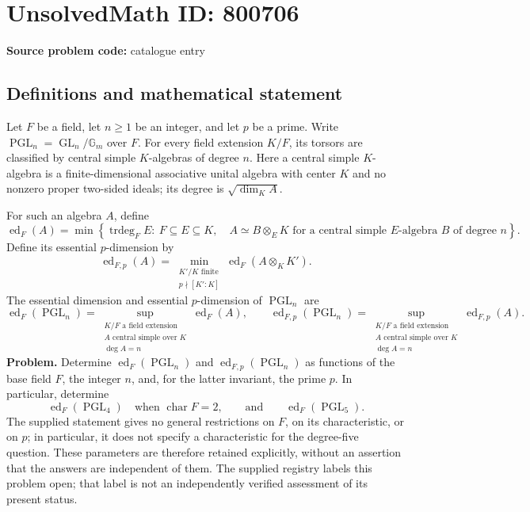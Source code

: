 \documentclass[11pt]{article}
\newcommand{\A}{\mathbb{A}}
\begin{document}
\section*{UnsolvedMath ID: 800706}
\textbf{Source problem code:} catalogue entry
\subsection{Definitions and mathematical statement}
Let \(F\) be a field, let \(n\geq 1\) be an integer, and let \(p\) be a prime. Write \(\operatorname{PGL}_n=\operatorname{GL}_n/\mathbb{G}_m\) over \(F\). For every field extension \(K/F\), its torsors are classified by central simple \(K\)-algebras of degree \(n\). Here a central simple \(K\)-algebra is a finite-dimensional associative unital algebra with center \(K\) and no nonzero proper two-sided ideals; its degree is \(\sqrt{\dim_K A}\).

For such an algebra \(A\), define
\[
\operatorname{ed}_F(A)=\min\left\{\operatorname{trdeg}_F E:\ F\subseteq E\subseteq K,\quad A\simeq B\otimes_E K\text{ for a central simple }E\text{-algebra }B\text{ of degree }n\right\}.
\]
Define its essential \(p\)-dimension by
\[
\operatorname{ed}_{F,p}(A)=\min_{\substack{K'/K\text{ finite}\\p\nmid[K':K]}}\operatorname{ed}_F(A\otimes_K K').
\]
The essential dimension and essential \(p\)-dimension of \(\operatorname{PGL}_n\) are
\[
\operatorname{ed}_F(\operatorname{PGL}_n)=\sup_{\substack{K/F\text{ a field extension}\\A\text{ central simple over }K\\\deg A=n}}\operatorname{ed}_F(A),
\qquad
\operatorname{ed}_{F,p}(\operatorname{PGL}_n)=\sup_{\substack{K/F\text{ a field extension}\\A\text{ central simple over }K\\\deg A=n}}\operatorname{ed}_{F,p}(A).
\]
\textbf{Problem.} Determine \(\operatorname{ed}_F(\operatorname{PGL}_n)\) and \(\operatorname{ed}_{F,p}(\operatorname{PGL}_n)\) as functions of the base field \(F\), the integer \(n\), and, for the latter invariant, the prime \(p\). In particular, determine
\[
\operatorname{ed}_F(\operatorname{PGL}_4)\quad\text{when }\operatorname{char}F=2,
\qquad\text{and}\qquad
\operatorname{ed}_F(\operatorname{PGL}_5).
\]
The supplied statement gives no general restrictions on \(F\), on its characteristic, or on \(p\); in particular, it does not specify a characteristic for the degree-five question. These parameters are therefore retained explicitly, without an assertion that the answers are independent of them. The supplied registry labels this problem open; that label is not an independently verified assessment of its present status.
\end{document}
